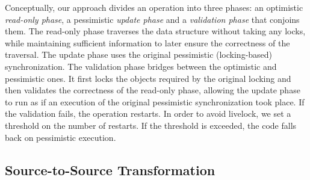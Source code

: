 Conceptually, our approach divides an operation into three phases: an optimistic \emph{read-only phase},
a pessimistic \emph{update phase} and a \emph{validation phase} that conjoins them.
The read-only phase traverses the data structure without taking any locks, while maintaining sufficient information to later ensure the correctness of the traversal.
The update phase uses the original pessimistic (locking-based) synchronization.
The validation phase bridges between the optimistic and pessimistic ones.
It first locks the objects required by
the original locking and then validates the correctness
of the read-only phase, allowing the
update phase to run as if an execution of the original pessimistic synchronization
took place. If the validation fails, the operation
restarts. In order to avoid livelock, we set a threshold on the number of restarts.
If the threshold is exceeded, the code falls back on pessimistic execution.




\subsection{Source-to-Source Transformation}\label{ssec:transformation}


